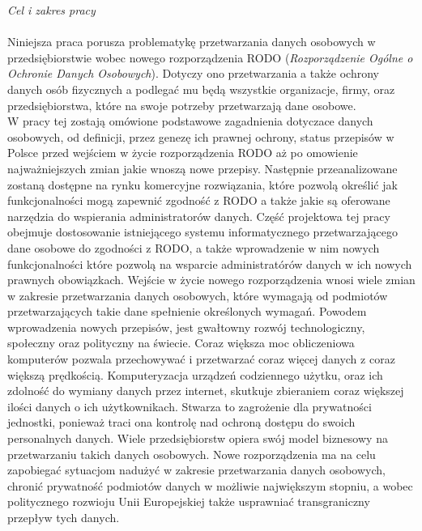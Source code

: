 \documentclass[en, noamssymb]{mgr}
\begin{document}
\textit{Cel i zakres pracy}\\ \\
\indent Niniejsza praca porusza problematykę przetwarzania danych osobowych w przedsiębiorstwie wobec nowego rozporządzenia RODO (\textit{Rozporządzenie Ogólne o Ochronie Danych Osobowych}). Dotyczy ono przetwarzania a także ochrony danych osób fizycznych a podlegać mu będą wszystkie organizacje, firmy, oraz przedsiębiorstwa, które na swoje potrzeby przetwarzają dane osobowe.\\
\indent W pracy tej zostają omówione podstawowe zagadnienia dotyczace danych osobowych, od definicji, przez genezę ich prawnej ochrony, status przepisów w Polsce przed wejściem w życie rozporządzenia RODO aż po omowienie najważniejszych zmian jakie wnoszą nowe przepisy. Następnie przeanalizowane zostaną dostępne na rynku komercyjne rozwiązania, które pozwolą określić jak funkcjonalności mogą zapewnić zgodność z RODO a także jakie są oferowane narzędzia do wspierania administratorów danych. Część projektowa tej pracy obejmuje dostosowanie istniejącego systemu informatycznego przetwarzającego dane osobowe do zgodności z RODO, a także wprowadzenie w nim nowych funkcjonalności które pozwolą na wsparcie administratórów danych w ich nowych prawnych obowiązkach.
\indent Wejście w życie nowego rozporządzenia wnosi wiele zmian w zakresie przetwarzania danych osobowych, które wymagają od podmiotów przetwarzających takie dane spełnienie określonych wymagań. Powodem wprowadzenia nowych przepisów, jest gwałtowny rozwój technologiczny, społeczny oraz polityczny na świecie. Coraz większa moc obliczeniowa komputerów pozwala przechowywać i przetwarzać coraz więcej danych z coraz większą prędkością. Komputeryzacja urządzeń codziennego użytku, oraz ich zdolność do wymiany danych przez internet, skutkuje zbieraniem coraz większej ilości danych o ich użytkownikach. Stwarza to zagrożenie dla prywatności jednostki, ponieważ traci ona kontrolę nad ochroną dostępu do swoich personalnych danych. Wiele przedsiębiorstw opiera swój model biznesowy na przetwarzaniu takich danych osobowych. Nowe rozporządzenia ma na celu zapobiegać sytuacjom nadużyć w zakresie przetwarzania danych osobowych, chronić prywatność podmiotów danych w możliwie największym stopniu, a wobec politycznego rozwioju Unii Europejskiej także usprawniać transgraniczny przepływ tych danych.\\ \\
\end{document}
